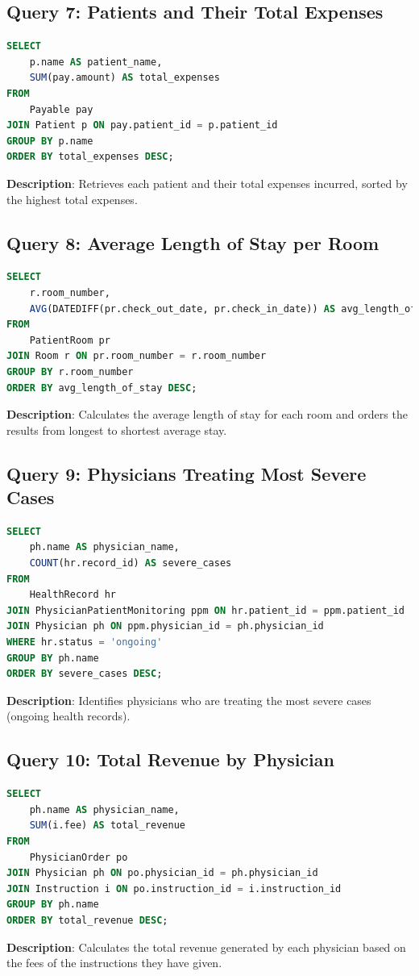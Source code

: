 \documentclass{article}
\begin{document}
\subsection{Query 7: Patients and Their Total Expenses}
\begin{lstlisting}[language=SQL]
SELECT 
    p.name AS patient_name,
    SUM(pay.amount) AS total_expenses
FROM 
    Payable pay
JOIN Patient p ON pay.patient_id = p.patient_id
GROUP BY p.name
ORDER BY total_expenses DESC;
\end{lstlisting}
\textbf{Description}: Retrieves each patient and their total expenses incurred, sorted by the highest total expenses.

\subsection{Query 8: Average Length of Stay per Room}
\begin{lstlisting}[language=SQL]
SELECT 
    r.room_number,
    AVG(DATEDIFF(pr.check_out_date, pr.check_in_date)) AS avg_length_of_stay
FROM 
    PatientRoom pr
JOIN Room r ON pr.room_number = r.room_number
GROUP BY r.room_number
ORDER BY avg_length_of_stay DESC;
\end{lstlisting}
\textbf{Description}: Calculates the average length of stay for each room and orders the results from longest to shortest average stay.

\subsection{Query 9: Physicians Treating Most Severe Cases}
\begin{lstlisting}[language=SQL]
SELECT 
    ph.name AS physician_name,
    COUNT(hr.record_id) AS severe_cases
FROM 
    HealthRecord hr
JOIN PhysicianPatientMonitoring ppm ON hr.patient_id = ppm.patient_id
JOIN Physician ph ON ppm.physician_id = ph.physician_id
WHERE hr.status = 'ongoing'
GROUP BY ph.name
ORDER BY severe_cases DESC;
\end{lstlisting}
\textbf{Description}: Identifies physicians who are treating the most severe cases (ongoing health records).

\subsection{Query 10: Total Revenue by Physician}
\begin{lstlisting}[language=SQL]
SELECT 
    ph.name AS physician_name,
    SUM(i.fee) AS total_revenue
FROM 
    PhysicianOrder po
JOIN Physician ph ON po.physician_id = ph.physician_id
JOIN Instruction i ON po.instruction_id = i.instruction_id
GROUP BY ph.name
ORDER BY total_revenue DESC;
\end{lstlisting}
\textbf{Description}: Calculates the total revenue generated by each physician based on the fees of the instructions they have given.
\end{document}
